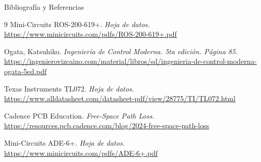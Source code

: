 \documentclass[10pt]{beamer}
\begin{document}
\begin{frame}[allowframebreaks]{Bibliografía y Referencias}
\begin{thebibliography}{9}
        Mini-Circuits ROS-200-619+. \textit{Hoja de datos.}
        \\ {\scriptsize \url{https://www.minicircuits.com/pdfs/ROS-200-619+.pdf}}

        \vspace{0.1 cm}

        Ogata, Katsuhiko. \textit{Ingeniería de Control Moderna. 5ta edición. Página 85.}
        \\ {\scriptsize \url{https://ingenierovizcaino.com/material/libros/sd/ingenieria-de-control-moderna-ogata-5ed.pdf}}

        \vspace{0.1 cm}

        Texas Instruments TL072. \textit{Hoja de datos.}
        \\ {\scriptsize \url{https://www.alldatasheet.com/datasheet-pdf/view/28775/TI/TL072.html}}

        \vspace{0.1 cm}

        Cadence PCB Education. \textit{Free-Space Path Loss.}
        \\ {\scriptsize \url{https://resources.pcb.cadence.com/blog/2024-free-space-path-loss}}

        \vspace{0.1 cm}

        Mini-Circuits ADE-6+. \textit{Hoja de datos.}
        \\ {\scriptsize \url{https://www.minicircuits.com/pdfs/ADE-6+.pdf}}
        
    \end{thebibliography}
\end{frame}
\end{document}
